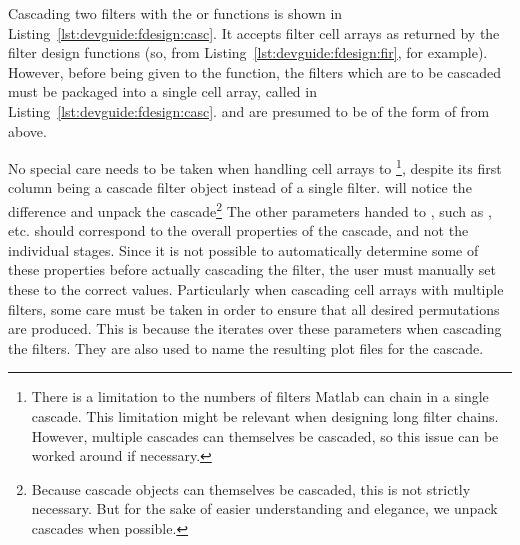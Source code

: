 Cascading two filters with the  or  functions
is  shown in  Listing~\ref{lst:devguide:fdesign:casc}. It accepts  filter cell
arrays  as  returned  by  the  filter design  functions  (so,    from
\mbox{Listing~\ref{lst:devguide:fdesign:fir}},  for example). However,  before
being  given to  the   function, the  filters which  are to  be
cascaded must  be packaged into a  single cell array, called   in
\mbox{Listing~\ref{lst:devguide:fdesign:casc}}.   and  are
presumed to be of the form of  from above.

No special care  needs to be taken when handling   cell arrays to
\footnote{%
    There is  a limitation  to the numbers  of filters Matlab  can chain  in a
    single  cascade. This limitation  might  be relevant  when designing  long
    filter chains. However,  multiple cascades can themselves  be cascaded, so
    this issue can be worked around if necessary.%
},
despite  its first  column  being  a cascade  filter  object
instead of  a single  filter.  will  notice the  difference and
unpack the cascade\footnote{
    Because cascade objects  can themselves be cascaded, this  is not strictly
    necessary.   But for  the sake  of easier  understanding and  elegance, we
    unpack cascades when possible.%
}
The other parameters  handed to , such  as , 
etc. should correspond  to the overall properties of the  cascade, and not the
individual stages. Since it is not possible to automatically determine some of
these properties before actually cascading  the filter, the user must manually
set these to the correct  values. Particularly when cascading cell arrays with
multiple filters, some care must be taken  in order to ensure that all desired
permutations are  produced. This is because the   iterates over
these parameters  when cascading the filters. They  are also used to  name the
resulting plot files for the cascade.


